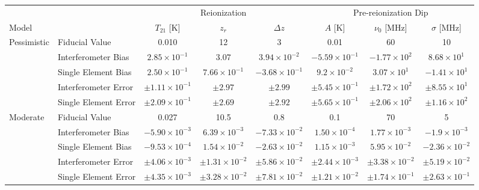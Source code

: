 \documentclass[twocolumn,apj,numberedappendix]{emulateapj}
\begin{document}
\begin{table}[htbp]
   \centering
   \begin{tabular}{@{} llcccccc @{}} %
      \toprule
      & & \multicolumn{3}{c}{Reionization} & \multicolumn{3}{c}{Pre-reionization Dip} \\
      \cmidrule(lr){3-5} %
      \cmidrule(lr){6-8} 
      Model &  & $T_{21}$ [K] & $z_r$ & $\Delta z$ & $A$ [K] & $\nu_0$ [MHz] & $\sigma$ [MHz]\\
      \midrule
      Pessimistic & Fiducial Value & 0.010 & 12 & 3 & 0.01 & 60 & 10 \\
      \cmidrule(l){2-8} 
      			 & Interferometer Bias & $2.85\times 10^{-1}$ & $3.07$ & $3.94 \times 10^{-2}$ & $-5.59\times 10^{-1}$ & $-1.77\times 10^2$ & $8.68 \times 10^1$ \\
			 & Single Element Bias & $2.50\times 10^{-1}$ & $7.66\times 10^{-1}$  & $-3.68\times 10^{-1}$  & $9.2\times 10^{-2}$ & $3.07 \times 10^{1}$  & $-1.41 \times 10^1$ \\	 
      			 & Interferometer Error & $\pm 1.11 \times 10^{-1}$ & $\pm 2.97$ & $\pm 2.99$ & $\pm 5.45 \times 10^{-1}$ & $\pm 1.72 \times 10^{2}$ & $\pm 8.55\times 10^1$ \\
      			 & Single Element Error  & $\pm 2.09\times 10^{-1} $ & $\pm 2.69$ & $\pm 2.92$ & $\pm 5.65\times 10^{-1}$ & $\pm 2.06 \times 10^{2} $ & $\pm 1.16 \times 10^{2}$ \\
      \midrule
      Moderate & Fiducial Value & 0.027 & 10.5 & 0.8 & 0.1 & 70 & 5 \\
      \cmidrule(l){2-8}
			 & Interferometer Bias & $-5.90\times 10^{-3}$ & $6.39\times 10^{-3}$ & $-7.33\times 10^{-2}$ & $1.50\times10^{-4}$ & $1.77\times 10^{-3}$ & $-1.9\times 10^{-3}$ \\
			 & Single Element Bias & $-9.53 \times 10^{-4}$ & $1.54\times 10^{-2}$ & $-2.63\times 10^{-2}$ & $1.15\times10^{-3}$ & $5.95\times 10^{-2}$ & $-2.36\times 10^{-2}$ \\	
      			 & Interferometer Error & $\pm 4.06\times 10^{-3}$ & $\pm 1.31\times 10^{-2}$ & $\pm 5.86\times 10^{-2}$ & $\pm 2.44 \times 10^{-3}$ & $\pm 3.38\times 10^{-2}$ & $\pm 5.19\times 10^{-2}$ \\
      			 & Single Element Error  & $\pm 4.35 \times 10^{-3}$ & $\pm 3.28 \times 10^{-2}$ & $\pm 7.81\times 10^{-2}$ & $\pm 1.21\times 10^{-2}$ & $\pm 1.74\times 10^{-1}$ & $\pm 2.63\times 10^{-1}$ \\

\end{tabular}
\end{table}
\end{document}
